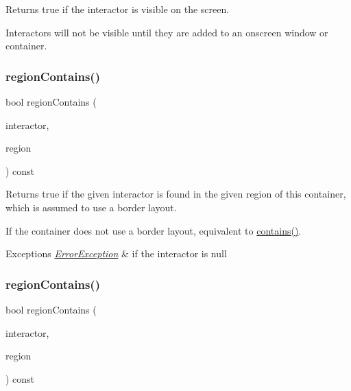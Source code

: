 Returns true if the interactor is visible on the screen. 

Interactors will not be visible until they are added to an onscreen window or container. \mbox{\label{classGContainer_a8909db9abf4dc80058f9e4a7b90ea2d0}} 
\subsubsection{\texorpdfstring{region\+Contains()}{regionContains()}\hspace{0.1cm}{\footnotesize\ttfamily [1/4]}}
{\footnotesize\ttfamily bool region\+Contains (\begin{DoxyParamCaption}\item[{\mbox{\hyperlink{classGInteractor}{G\+Interactor}} $\ast$}]{interactor,  }\item[{\mbox{\hyperlink{classGContainer_a81a01a86de31071a92e6cce0bab9bc4b}{G\+Container\+::\+Region}}}]{region }\end{DoxyParamCaption}) const\hspace{0.3cm}{\ttfamily [virtual]}}



Returns true if the given interactor is found in the given region of this container, which is assumed to use a border layout. 

If the container does not use a border layout, equivalent to \mbox{\hyperlink{classGContainer_a29e67f98cd36414c67475b8941d861a6}{contains()}}. 
\begin{DoxyExceptions}{Exceptions}
{\em \mbox{\hyperlink{classErrorException}{Error\+Exception}}} & if the interactor is null \\
\hline
\end{DoxyExceptions}
\mbox{\label{classGContainer_a84a56bae6b8883d27e44d51c31b2bfc5}} 
\subsubsection{\texorpdfstring{region\+Contains()}{regionContains()}\hspace{0.1cm}{\footnotesize\ttfamily [2/4]}}
{\footnotesize\ttfamily bool region\+Contains (\begin{DoxyParamCaption}\item[{\mbox{\hyperlink{classGInteractor}{G\+Interactor}} $\ast$}]{interactor,  }\item[{const std\+::string \&}]{region }\end{DoxyParamCaption}) const\hspace{0.3cm}{\ttfamily [virtual]}}



